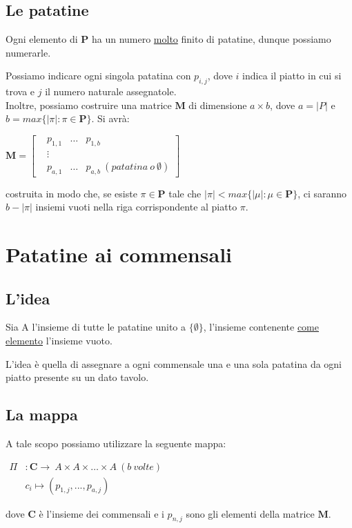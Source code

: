 \documentclass[a4paper,12pt]{article}
\begin{document}
    \subsection{Le patatine}
    \begin{osservazione}
        Ogni elemento di $\mathbf{P}$ ha un numero \underline{molto} finito di patatine, dunque possiamo numerarle.
    \end{osservazione}
    \begin{notazione}
        Possiamo indicare ogni singola patatina con $p_{i,j}$, dove $i$ indica il piatto in cui si trova e $j$ il numero naturale assegnatole.\\
        Inoltre, possiamo costruire una matrice $\mathbf{M}$ di dimensione $a\times b$, dove $a=|P|$ e $b=max\{|\pi|:\pi\in\mathbf{P}\}$. Si avrà:
        \begin{center}
            $\mathbf{M}=
            \begin{bmatrix}
                & p_{1,1} & \dots & p_{1,b}\\
                &\vdots\\
                & p_{a,1} & \dots & p_{a,b}\ (patatina\ o\ \emptyset )
            \end{bmatrix}$
        \end{center}
        costruita in modo che, se esiste $\pi\in\mathbf{P}$ tale che $|\pi|<max\{|\mu|:\mu\in\mathbf{P}\}$, ci saranno $b-|\pi|$ insiemi vuoti nella riga corrispondente al piatto $\pi$.
    \end{notazione}
    \section{Patatine ai commensali}
    \subsection{L'idea}
    \begin{definizione}
        Sia A l'insieme di tutte le patatine unito a $\{\emptyset\}$, l'insieme contenente \underline{come elemento} l'insieme vuoto.
    \end{definizione}    
    L'idea è quella di assegnare a ogni commensale una e una sola patatina da ogni piatto presente su un dato tavolo.
    \subsection{La mappa}
    A tale scopo possiamo utilizzare la seguente mappa:
    \begin{center}
        $\begin{matrix}
        \Pi&\!\!\!\!:\mathbf{C}\longrightarrow\ A\times A\times\dots \times A\ (b\ volte)\\
           &\!\!\!\!\!\!\!\!\!\!\!\!\!\!\!\!\!\!\!\!\!\!\!\!\!\!\!\!\!\!\!\!\!\!\!\!c_i \longmapsto (p_{1,j},..., p_{a,j})
        \end{matrix}$
    \end{center}
    dove $\mathbf{C}$ è l'insieme dei commensali e i $p_{n,j}$ sono gli elementi della matrice $\mathbf{M}$.
\end{document}

